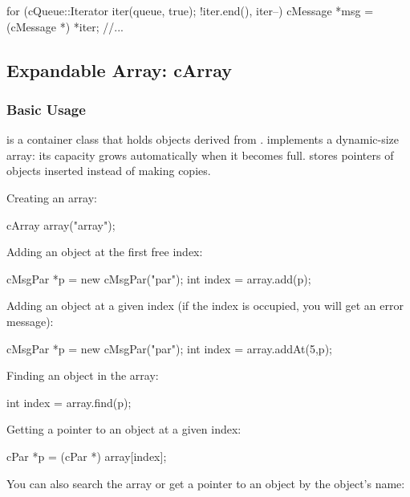 \begin{cpp}
for (cQueue::Iterator iter(queue, true); !iter.end(), iter--) {
    cMessage *msg = (cMessage *) *iter;
    //...
}
\end{cpp}



\subsection{Expandable Array: cArray}
\label{sec:sim-lib:carray}

\subsubsection{Basic Usage}
\label{sec:sim-lib:carray-basic-usage}

 is a container class that holds objects derived from
.  implements a dynamic-size array: its
capacity grows automatically when it becomes full.  stores
pointers of objects inserted instead of making copies.

Creating an array:

\begin{cpp}
cArray array("array");
\end{cpp}

Adding an object at the first free index:

\begin{cpp}
cMsgPar *p = new cMsgPar("par");
int index = array.add(p);
\end{cpp}

Adding an object at a given index (if the index is occupied,
you will get an error message):

\begin{cpp}
cMsgPar *p = new cMsgPar("par");
int index = array.addAt(5,p);
\end{cpp}

Finding an object in the array:

\begin{cpp}
int index = array.find(p);
\end{cpp}

Getting a pointer to an object at a given index:

\begin{cpp}
cPar *p = (cPar *) array[index];
\end{cpp}

You can also search the array or get a pointer to an object by
the object's name:

